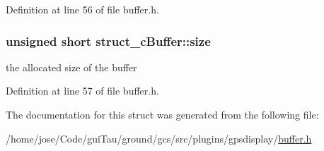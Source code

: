 Definition at line 56 of file buffer.\-h.

\hypertarget{structstruct__c_buffer_a80e300447a52eb0b66fd4d754aeb9b1c}{
\subsubsection[{size}]{\setlength{\rightskip}{0pt plus 5cm}unsigned short struct\-\_\-c\-Buffer\-::size}}\label{structstruct__c_buffer_a80e300447a52eb0b66fd4d754aeb9b1c}


the allocated size of the buffer 



Definition at line 57 of file buffer.\-h.



The documentation for this struct was generated from the following file\-:\begin{DoxyCompactItemize}
\item 
/home/jose/\-Code/gui\-Tau/ground/gcs/src/plugins/gpsdisplay/\hyperlink{buffer_8h}{buffer.\-h}\end{DoxyCompactItemize}
